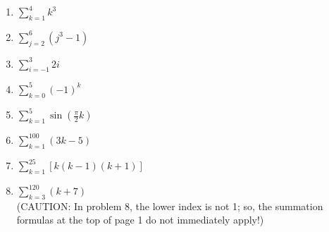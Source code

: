 \documentclass[12pt]{article}
\newif\ifans
\begin{document}
\begin{enumerate}

\item $\sum\limits_{k=1}^{4}k^3$ 

\ifans{\fbox{100}} \fi

\item $\sum\limits_{j=2}^{6} (j^3-1)$ 

\ifans{\fbox{435}} \fi

\item $\sum_{i=-1}^3{2i}$

\ifans{\fbox{10}} \fi

\item $\sum_{k=0}^5{(-1)^k}$

\ifans{\fbox{0}} \fi

\item $\sum_{k=1}^5{\sin{\left(\frac{\pi}{2}k\right)}}$

\ifans{\fbox{1}} \fi

\end{enumerate}


\begin{enumerate}
\setcounter{enumi}{5}

\item $\sum_{k=1}^{100}{(3k-5)}$

\ifans{\fbox{14,650}} \fi

\item $\sum\limits_{k=1}^{25}[ k(k-1)(k+1)]$ 

\ifans{\fbox{105,300}} \fi

\item $\sum_{k=3}^{120}{(k+7)}$\\

(CAUTION: In problem 8, the lower index is not 1; so, the summation formulas at the top of page 1 do not immediately apply!)

\ifans{\fbox{8,083; Video Solution: \textcolor{blue}{\href{https://www.youtube.com/watch?v=Cq08CHq0wlY}{https://www.youtube.com/watch?v=Cq08CHq0wlY}}}} \fi

\end{enumerate}

\end{document}
